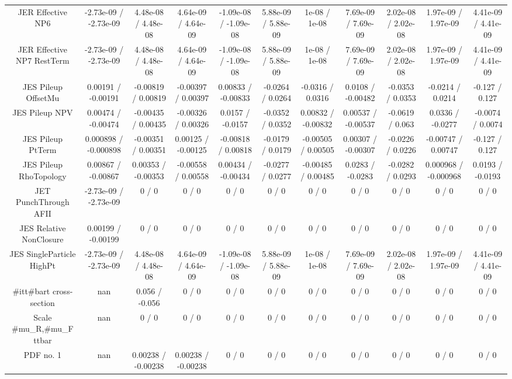 \begin{table}[htbp]
\begin{center}
\begin{tabular}{|c|c|c|c|c|c|c|c|c|c|c|}
  JER Effective NP6 & -2.73e-09 / -2.73e-09 & 4.48e-08 / 4.48e-08 & 4.64e-09 / 4.64e-09 & -1.09e-08 / -1.09e-08 & 5.88e-09 / 5.88e-09 & 1e-08 / 1e-08 & 7.69e-09 / 7.69e-09 & 2.02e-08 / 2.02e-08 & 1.97e-09 / 1.97e-09 & 4.41e-09 / 4.41e-09 \\ 
  JER Effective NP7 RestTerm & -2.73e-09 / -2.73e-09 & 4.48e-08 / 4.48e-08 & 4.64e-09 / 4.64e-09 & -1.09e-08 / -1.09e-08 & 5.88e-09 / 5.88e-09 & 1e-08 / 1e-08 & 7.69e-09 / 7.69e-09 & 2.02e-08 / 2.02e-08 & 1.97e-09 / 1.97e-09 & 4.41e-09 / 4.41e-09 \\ 
  JES Pileup OffsetMu & 0.00191 / -0.00191 & -0.00819 / 0.00819 & -0.00397 / 0.00397 & 0.00833 / -0.00833 & -0.0264 / 0.0264 & -0.0316 / 0.0316 & 0.0108 / -0.00482 & -0.0353 / 0.0353 & -0.0214 / 0.0214 & -0.127 / 0.127 \\ 
  JES Pileup NPV & 0.00474 / -0.00474 & -0.00435 / 0.00435 & -0.00326 / 0.00326 & 0.0157 / -0.0157 & -0.0352 / 0.0352 & 0.00832 / -0.00832 & 0.00537 / -0.00537 & -0.0619 / 0.063 & 0.0336 / -0.0277 & -0.0074 / 0.0074 \\ 
  JES Pileup PtTerm & 0.000898 / -0.000898 & -0.00351 / 0.00351 & 0.00125 / -0.00125 & -0.00818 / 0.00818 & -0.0179 / 0.0179 & -0.00505 / 0.00505 & 0.00307 / -0.00307 & -0.0226 / 0.0226 & -0.00747 / 0.00747 & -0.127 / 0.127 \\ 
  JES Pileup RhoTopology & 0.00867 / -0.00867 & 0.00353 / -0.00353 & -0.00558 / 0.00558 & 0.00434 / -0.00434 & -0.0277 / 0.0277 & -0.00485 / 0.00485 & 0.0283 / -0.0283 & -0.0282 / 0.0293 & 0.000968 / -0.000968 & 0.0193 / -0.0193 \\ 
  JET PunchThrough AFII & -2.73e-09 / -2.73e-09 & 0 / 0 & 0 / 0 & 0 / 0 & 0 / 0 & 0 / 0 & 0 / 0 & 0 / 0 & 0 / 0 & 0 / 0 \\ 
  JES Relative NonClosure & 0.00199 / -0.00199 & 0 / 0 & 0 / 0 & 0 / 0 & 0 / 0 & 0 / 0 & 0 / 0 & 0 / 0 & 0 / 0 & 0 / 0 \\ 
  JES SingleParticle HighPt & -2.73e-09 / -2.73e-09 & 4.48e-08 / 4.48e-08 & 4.64e-09 / 4.64e-09 & -1.09e-08 / -1.09e-08 & 5.88e-09 / 5.88e-09 & 1e-08 / 1e-08 & 7.69e-09 / 7.69e-09 & 2.02e-08 / 2.02e-08 & 1.97e-09 / 1.97e-09 & 4.41e-09 / 4.41e-09 \\ 
  #it{t#bar{t}} cross-section &    nan    & 0.056 / -0.056 & 0 / 0 & 0 / 0 & 0 / 0 & 0 / 0 & 0 / 0 & 0 / 0 & 0 / 0 & 0 / 0 \\ 
  Scale #mu_{R},#mu_{F} ttbar &    nan    & 0 / 0 & 0 / 0 & 0 / 0 & 0 / 0 & 0 / 0 & 0 / 0 & 0 / 0 & 0 / 0 & 0 / 0 \\ 
  PDF no. 1 &    nan    & 0.00238 / -0.00238 & 0.00238 / -0.00238 & 0 / 0 & 0 / 0 & 0 / 0 & 0 / 0 & 0 / 0 & 0 / 0 & 0 / 0 \\ 

\end{tabular}
\end{center}
\end{table}
